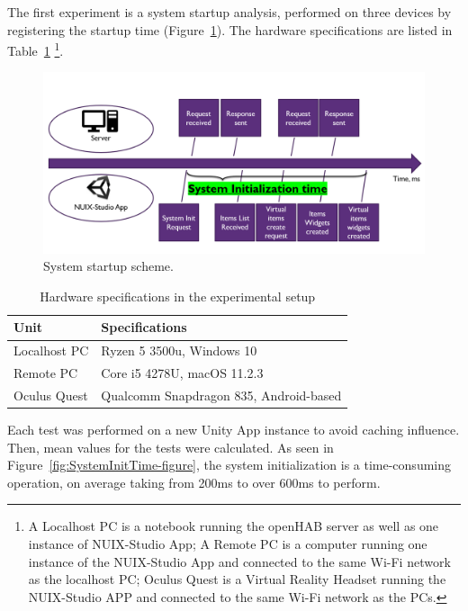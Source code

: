 The first experiment is a system startup analysis, performed on three devices by registering the startup time (Figure~\ref{fig:SystemStartupScheme-figure}). The hardware specifications are listed in Table~\ref{tab:hardware-specifications-table} \footnote{A Localhost PC is a notebook running the openHAB server as well as one instance of NUIX-Studio App; A Remote PC is a computer running one instance of the NUIX-Studio App and connected to the same Wi-Fi network as the localhost PC; Oculus Quest is a Virtual Reality Headset running the NUIX-Studio APP and connected to the same Wi-Fi network as the PCs.}.

\begin{figure}
  \centering
  \includegraphics[width = 0.9 \linewidth]{figures/SystemStartupScheme.png}
  \caption{System startup scheme.}
  \label{fig:SystemStartupScheme-figure}
\end{figure}

\begin{table}
  \centering
  \begin{threeparttable}[c]
    \caption{Hardware specifications in the experimental setup}
    \label{tab:hardware-specifications-table}
    \begin{tabular}{ll}
      \toprule
      Unit    &         Specifications                 \\
      \midrule
      Localhost PC & Ryzen 5 3500u, Windows 10 \\
      Remote PC & Core i5 4278U, macOS 11.2.3    \\
      Oculus Quest        & Qualcomm Snapdragon 835, Android-based            \\
      \bottomrule
    \end{tabular}
  \end{threeparttable}
\end{table}

Each test was performed on a new Unity App instance to avoid caching influence. Then, mean values for the tests were calculated. As seen in Figure~\ref{fig:SystemInitTime-figure}, the system initialization is a time-consuming operation, on average taking from 200ms to over 600ms to perform.

